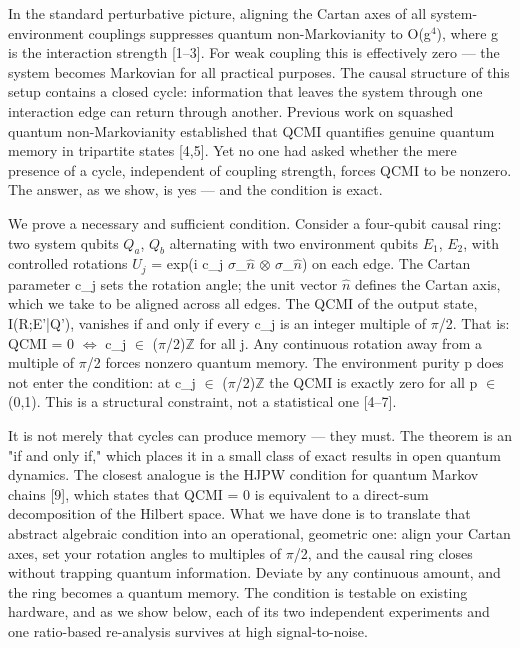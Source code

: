 \documentclass[twocolumn,aps,prl]{revtex4-2}
\begin{document}
In the standard perturbative picture, aligning the Cartan axes of all system-environment couplings suppresses quantum non-Markovianity to O(g$^4$), where g is the interaction strength [1–3]. For weak coupling this is effectively zero — the system becomes Markovian for all practical purposes. The causal structure of this setup contains a closed cycle: information that leaves the system through one interaction edge can return through another. Previous work on squashed quantum non-Markovianity established that QCMI quantifies genuine quantum memory in tripartite states [4,5]. Yet no one had asked whether the mere presence of a cycle, independent of coupling strength, forces QCMI to be nonzero. The answer, as we show, is yes — and the condition is exact.

We prove a necessary and sufficient condition. Consider a four-qubit causal ring: two system qubits $Q_a$, $Q_b$ alternating with two environment qubits $E_1$, $E_2$, with controlled rotations $U_j$ = exp(i c_j $\sigma$_$\hat{n}$ $\otimes$ $\sigma$_$\hat{n}$) on each edge. The Cartan parameter c_j sets the rotation angle; the unit vector $\hat{n}$ defines the Cartan axis, which we take to be aligned across all edges. The QCMI of the output state, I(R;E'|Q'), vanishes if and only if every c_j is an integer multiple of $\pi$/2. That is: QCMI = 0 $\iff$ c_j $\in$ ($\pi$/2)$\mathbb{Z}$ for all j. Any continuous rotation away from a multiple of $\pi$/2 forces nonzero quantum memory. The environment purity p does not enter the condition: at c_j $\in$ ($\pi$/2)$\mathbb{Z}$ the QCMI is exactly zero for all p $\in$ (0,1). This is a structural constraint, not a statistical one [4–7].

It is not merely that cycles can produce memory — they must. The theorem is an "if and only if," which places it in a small class of exact results in open quantum dynamics. The closest analogue is the HJPW condition for quantum Markov chains [9], which states that QCMI = 0 is equivalent to a direct-sum decomposition of the Hilbert space. What we have done is to translate that abstract algebraic condition into an operational, geometric one: align your Cartan axes, set your rotation angles to multiples of $\pi$/2, and the causal ring closes without trapping quantum information. Deviate by any continuous amount, and the ring becomes a quantum memory. The condition is testable on existing hardware, and as we show below, each of its two independent experiments and one ratio-based re-analysis survives at high signal-to-noise.
\end{document}
